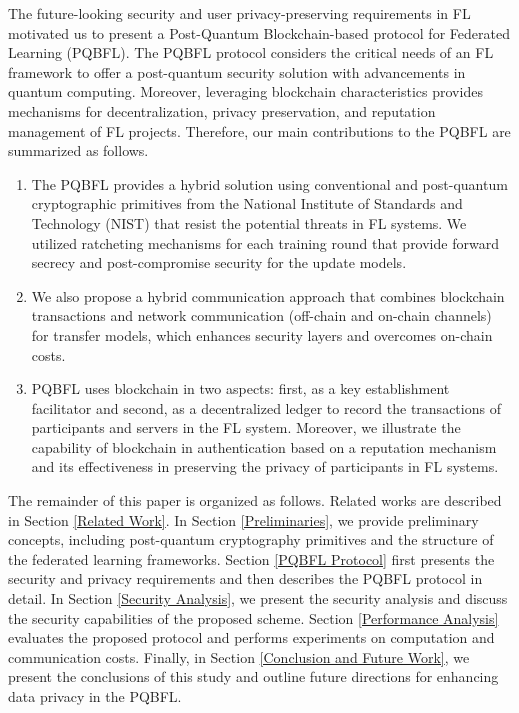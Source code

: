 \documentclass[a4paper,fleqn]{cas-dc}
\begin{document}
The future-looking security and user privacy-preserving requirements in FL motivated us to present a Post-Quantum Blockchain-based protocol for Federated Learning (PQBFL). 
The PQBFL protocol considers the critical needs of an FL framework to offer a post-quantum security solution with advancements in quantum computing.  Moreover, leveraging blockchain characteristics provides mechanisms for decentralization, privacy preservation, and reputation management of FL projects.  Therefore, our main contributions to the PQBFL are summarized as follows.  
 \begin{enumerate}     
    \item The PQBFL provides a hybrid solution using conventional and post-quantum cryptographic primitives from the National Institute of Standards and Technology (NIST) \citep{standard_kyber} that resist the potential threats in FL systems.     
    We utilized ratcheting mechanisms for each training round that provide forward secrecy and post-compromise security for the update models.     
    \item We also propose a hybrid communication approach that combines blockchain transactions and network communication (off-chain and on-chain channels) for transfer models, which enhances security layers and overcomes on-chain costs.   
    \item PQBFL uses blockchain in two aspects: first, as a key establishment facilitator and second, as a decentralized ledger to record the transactions of participants and servers in the FL system.     
    Moreover, we illustrate the capability of blockchain in authentication based on a reputation mechanism and its effectiveness in preserving the privacy of participants in FL systems. \end{enumerate}  
The remainder of this paper is organized as follows. 
Related works are described in Section \ref{Related Work}.  In Section \ref{Preliminaries}, we provide preliminary concepts, including post-quantum cryptography primitives and the structure of the federated learning frameworks.  
Section \ref{PQBFL Protocol} first presents the security and privacy requirements and then describes the PQBFL protocol in detail.  
In Section \ref{Security Analysis}, we present the security analysis and discuss the security capabilities of the proposed scheme.  
Section \ref{Performance Analysis} evaluates the proposed protocol and performs experiments on computation and communication costs. 
Finally, in Section \ref{Conclusion and Future Work}, we present the conclusions of this study and outline future directions for enhancing data privacy in the PQBFL.
\end{document}
